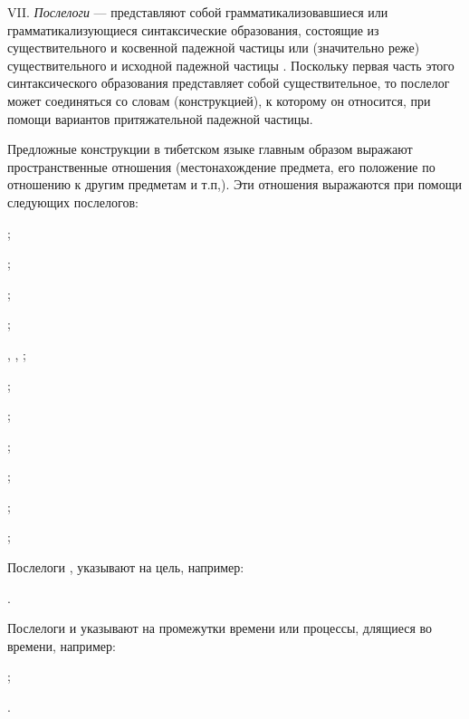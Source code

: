 VII. \emph{Послелоги} --- представляют собой грамматикализовавшиеся или грамматикализующиеся синтаксические образования, состоящие из существительного и косвенной падежной частицы или (значительно реже) существительного и исходной падежной частицы . Поскольку первая часть этого синтаксического образования представляет собой существительное, то послелог может соединяться со
словам (конструкцией), к которому он относится, при помощи вариантов притяжательной падежной частицы.

Предложные конструкции в тибетском языке главным образом выражают пространственные отношения (местонахождение предмета, его положение по отношению к другим предметам и т.п,). Эти отношения выражаются при помощи следующих послелогов:
\begin{prfsample}
	\item {};
	\item {};
	\item {};
	\item {};
	\item {}, , ;
	\item {};
	\item {};
	\item {};
	\item {};
	\item {};
	\item {};
\end{prfsample}

Послелоги ,  указывают на цель, например:
\begin{prfsample}
	\item {}.
\end{prfsample}

Послелоги  и  указывают на промежутки времени или процессы, длящиеся во времени, например:
\begin{prfsample}
	\item {};
	\item {}.
\end{prfsample}

